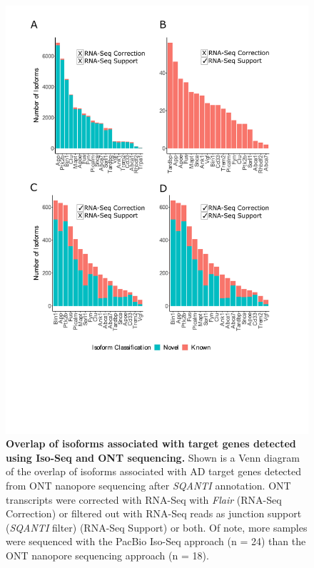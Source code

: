 \begin{figure}[!htp]
	\centering
	\includegraphics[page=2,trim={0cm 20cm 0cm 0cm},clip,scale = 0.55]{Figures/ONTTargetedTranscriptome_BioinformaticsPipeline}
	\captionsetup{width=0.95\textwidth,singlelinecheck=off}
	\caption[Overlap of isoforms associated with target genes detected using Iso-Seq and ONT sequencing]%
	{\textbf{Overlap of isoforms associated with target genes detected using Iso-Seq and ONT sequencing.} Shown is a Venn diagram of the overlap of isoforms associated with AD target genes detected from ONT nanopore sequencing after \textit{SQANTI} annotation. ONT transcripts were corrected with RNA-Seq with \textit{Flair} (RNA-Seq Correction) or filtered out with RNA-Seq reads as junction support (\textit{SQANTI} filter) (RNA-Seq Support) or both. Of note, more samples were sequenced with the PacBio Iso-Seq approach (n = 24) than the ONT nanopore sequencing approach (n = 18).   
	}
	\label{fig:ONT_isoseq_comparisons}
\end{figure}

